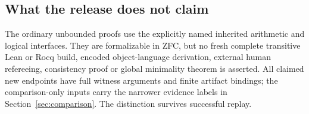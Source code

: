 \subsection{What the release does not claim}
The ordinary unbounded proofs use the explicitly named inherited arithmetic
and logical interfaces. They are formalizable in ZFC, but no fresh complete
transitive Lean or Rocq build, encoded object-language derivation, external
human refereeing, consistency proof or global minimality theorem is asserted.
All claimed new endpoints have full witness arguments and finite artifact
bindings; the comparison-only inputs carry the narrower evidence labels in
Section~\ref{sec:comparison}. The distinction survives successful replay.
